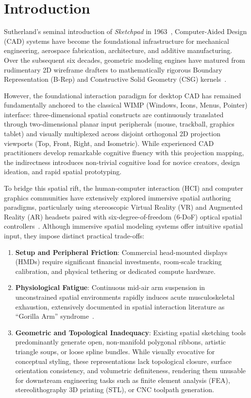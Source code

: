 \section{Introduction}
\label{sec:introduction}

 Sutherland's seminal introduction of \textit{Sketchpad} in 1963~\cite{sutherland1963sketchpad}, Computer-Aided Design (CAD) systems have become the foundational infrastructure for mechanical engineering, aerospace fabrication, architecture, and additive manufacturing. Over the subsequent six decades, geometric modeling engines have matured from rudimentary 2D wireframe drafters to mathematically rigorous Boundary Representation (B-Rep) and Constructive Solid Geometry (CSG) kernels~\cite{mantyla1988,hoffmann1989geometric}. 

However, the foundational interaction paradigm for desktop CAD has remained fundamentally anchored to the classical WIMP (Windows, Icons, Menus, Pointer) interface: three-dimensional spatial constructs are continuously translated through two-dimensional planar input peripherals (mouse, trackball, graphics tablet) and visually multiplexed across disjoint orthogonal 2D projection viewports (Top, Front, Right, and Isometric). While experienced CAD practitioners develop remarkable cognitive fluency with this projection mapping, the indirectness introduces non-trivial cognitive load for novice creators, design ideation, and rapid spatial prototyping.

To bridge this spatial rift, the human-computer interaction (HCI) and computer graphics communities have extensively explored immersive spatial authoring paradigms, particularly using stereoscopic Virtual Reality (VR) and Augmented Reality (AR) headsets paired with six-degree-of-freedom ($6$-DoF) optical spatial controllers~\cite{gravitysketch,tiltbrush}. Although immersive spatial modeling systems offer intuitive spatial input, they impose distinct practical trade-offs:
\begin{enumerate}
    \item \textbf{Setup and Peripheral Friction}: Commercial head-mounted displays (HMDs) require significant financial investments, room-scale tracking calibration, and physical tethering or dedicated compute hardware.
    \item \textbf{Physiological Fatigue}: Continuous mid-air arm suspension in unconstrained spatial environments rapidly induces acute musculoskeletal exhaustion, extensively documented in spatial interaction literature as ``Gorilla Arm'' syndrome~\cite{song2014air}.
    \item \textbf{Geometric and Topological Inadequacy}: Existing spatial sketching tools predominantly generate open, non-manifold polygonal ribbons, artistic triangle soups, or loose spline bundles. While visually evocative for conceptual styling, these representations lack topological closure, surface orientation consistency, and volumetric definiteness, rendering them unusable for downstream engineering tasks such as finite element analysis (FEA), stereolithography 3D printing (STL), or CNC toolpath generation.
\end{enumerate}

